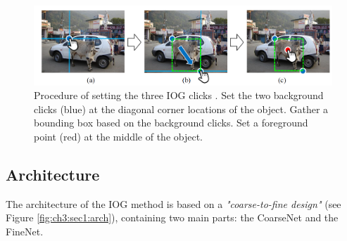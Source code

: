 \begin{figure}
	\includegraphics[width=\linewidth]{figures/chap31_clicks.png}
	\caption{Procedure of setting the three IOG clicks \cite{Zha20-IOG}. Set the two background clicks (blue) at the diagonal corner locations of the object. Gather a bounding box based on the background clicks. Set a foreground point (red) at the middle of the object.}
	\label{fig:ch3:sec1:iog}
\end{figure}

\subsection{Architecture}\label{ord:ch3:sec1:subsec2}

The architecture of the IOG method is based on a \emph{"coarse-to-fine design"}\cite[p. 12237]{Zha20-IOG} (see Figure \ref{fig:ch3:sec1:arch}), containing two main parts: the CoarseNet and the FineNet.

